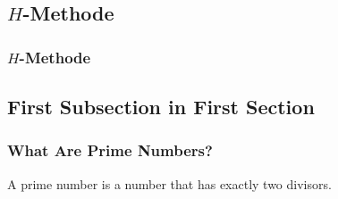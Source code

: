 \documentclass[10pt]{beamer}
\begin{document}
\subsection{$H$-Methode}
\begin{frame}
  \frametitle{$H$-Methode}

\end{frame}

\subsection[Subsection 1]{First Subsection in First Section}

\begin{frame}
  \frametitle{What Are Prime Numbers?}
  \begin{definition}
  A \alert{prime number} is a number that has exactly two divisors.
  \end{definition}
\end{frame}
\end{document}
